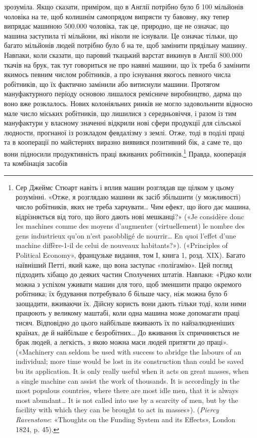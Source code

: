 \parcont{}  %
зрозуміла. Якщо сказати, приміром, що в Англії потрібно було б
100 мільйонів чоловіка на те, щоб колишнім самопрядом випрясти
ту бавовну, яку тепер випрядає машиною 500.000 чоловіка, так це,
природно, ще не означає, що машина заступила ті мільйони, які
ніколи не існували. Це означає тільки, що багато мільйонів
людей потрібно було б на те, щоб замінити прядільну машину.
Навпаки, коли сказати, що паровий ткацький варстат викинув
в Англії 800.000 ткачів на брук, так тут говориться не про наявні
машини, що їх треба б замінити якимось певним числом робітників,
а про існування якогось певного числа робітників, що їх
фактично замінили або витиснули машини. Протягом мануфактурного
періоду основою лишалося ремісниче виробництво, дарма
що воно вже розклалось. Нових колоніяльних ринків не могло
задовольнити відносно мале число міських робітників, що лишилися
з середньовіччя, і разом із тим мануфактури у власному
значенні відкрили нові сфери продукції для сільської людности,
прогнаної із розкладом февдалізму з землі. Отже, тоді в поділі
праці та в кооперації по майстернях виразно виявився позитивний
бік, а саме те, що вони підносили продуктивність праці вживаних
робітників.\footnote{
Сер Джеймс Стюарт навіть і вплив машин розглядав ще цілком у
цьому розумінні. «Отже, я розглядаю машини як засіб збільшити (у можливості)
число робітників, яких не треба харчувати\dots{} Чим ефект, що його
дає машина, відрізняється від того, що його дають нові мешканці?»
(«Je considère donc les machines comme des moyens d’augmenter (virtuellement)
le nombre des gens industrieux qu’on n’est pasobbligé de nourrir\dots{}
En quoi l’effet d’une machine diffère-1-il de celui de nouveaux habitants?»).
(«Principles of Political Economy», французьке видання, том І, книга 1,
розд. XIX). Багато наївніший Петті, який каже, що вона заступає «полігамію».
Цей погляд підходить хібащо до деяких частин Сполучених штатів.
Навпаки: «Рідко коли можна з успіхом уживати машин для того, щоб
зменшити працю окремого робітника; їх будування потребувало б більше
часу, ніж можна було б заощадити, вживаючи їх. Дійсну користь вони
дають тільки тоді, коли ними працюють у великому маштабі, коли одна
машина може допомагати праці тисяч. Відповідно до цього найбільше
вживають їх по найзалюдненіших країнах, де й найбільше є безробітних\dots{}
До вживання їх спричиняється не брак людей, а легкість, з якою можна
маси людей притягти до праці». («Machinery can seldom be used with success
to abridge the labours of an individual; more time would be lost in its
construction than could be saved bu its application. It is only really useful
when it acts on great masses, when a single machine can assist the work
of thousands. It is accordingly in the most populous countries, where there
are most idle men, that it is always most abundant\dots{} It is not called into
use by a scarcity of men, but by the facility with which they can be
brought to act in masses»). (\emph{Piercy Ravenstone}: «Thoughts on the Funding
System and its Effects», London 1824, p. 45).
} Правда, кооперація та комбінація засобів
